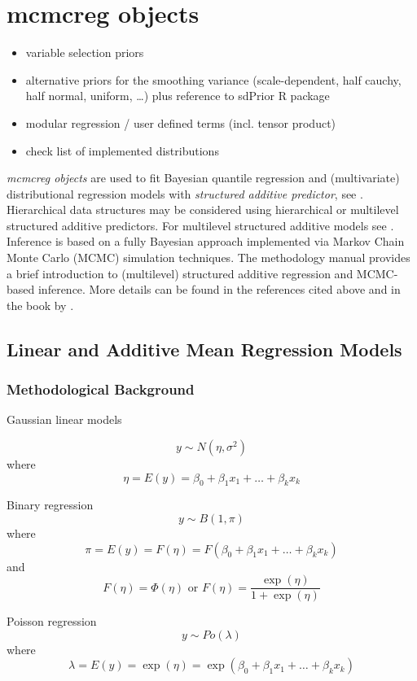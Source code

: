 \chapter{mcmcreg objects}
\label{mcmcreg} 

\begin{itemize}
 \item variable selection priors
 \item alternative priors for the smoothing variance (scale-dependent, half cauchy, half normal, uniform, \ldots) plus reference to sdPrior R package
 \item modular regression / user defined terms (incl. tensor product)
 \item check list of implemented distributions
\end{itemize}

{\em mcmcreg objects} are used to fit Bayesian quantile regression and (multivariate) distributional regression models with {\em
structured additive predictor}, see . Hierarchical data structures may be considered using
hierarchical or multilevel structured additive predictors. For multilevel structured additive models  see
. Inference is based on a fully Bayesian approach implemented via Markov Chain Monte Carlo (MCMC)
simulation techniques. The methodology manual provides a brief introduction to (multilevel) structured additive regression and MCMC-based
inference. More details can be found in the references cited above and in the book by .

\section{Linear and Additive Mean Regression Models}

\subsection{Methodological Background}

Gaussian linear models

$$
y \sim N(\eta,\sigma^2)
$$
where
$$
 \eta = E(y) = \beta_0 + \beta_1 x_1 + \ldots + \beta_k x_k
$$

Binary regression
$$
y \sim B(1,\pi)
$$
where
$$
\pi = E(y) = F(\eta) = F(\beta_0 + \beta_1 x_1 + \ldots + \beta_k x_k)
$$
and
$$
F(\eta) = \Phi(\eta) \mbox{ or } F(\eta) = \frac{\exp(\eta)}{1+\exp(\eta)}
$$

Poisson regression
$$
y \sim Po(\lambda)
$$
where
$$
\lambda = E(y) = \exp(\eta) = \exp(\beta_0 + \beta_1 x_1 + \ldots + \beta_k x_k)
$$

